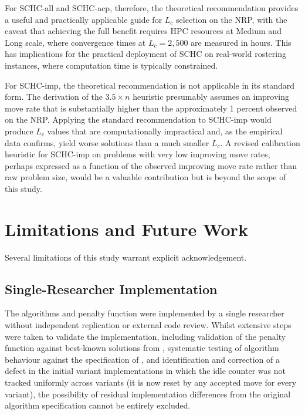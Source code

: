 \documentclass[12pt, a4paper, oneside]{report}
\begin{document}
For SCHC-all and SCHC-acp, therefore, the theoretical recommendation
provides a useful and practically applicable guide for $L_c$
selection on the NRP, with the caveat that achieving the full benefit
requires HPC resources at Medium and Long scale, where convergence
times at $L_c = 2{,}500$ are measured in hours. This has implications
for the practical deployment of SCHC on real-world rostering
instances, where computation time is typically constrained.

For SCHC-imp, the theoretical recommendation is not applicable in
its standard form. The derivation of the $3.5 \times n$ heuristic
presumably assumes an improving move rate that is substantially
higher than the approximately 1 percent observed on the NRP.
Applying the standard recommendation to SCHC-imp would produce $L_c$
values that are computationally impractical and, as the empirical
data confirms, yield worse solutions than a much smaller $L_c$. A
revised calibration heuristic for SCHC-imp on problems with very
low improving move rates, perhaps expressed as a function of the
observed improving move rate rather than raw problem size, would be a
valuable contribution but is beyond the scope of this study.

\newpage
\section{Limitations and Future Work}
\label{sec:limitations}

Several limitations of this study warrant explicit acknowledgement.

\subsection{Single-Researcher Implementation}
\label{sec:disc_solo}

The algorithms and penalty function were implemented by a single
researcher without independent replication or external code review.
Whilst extensive steps were taken to validate the implementation,
including validation of the penalty function against best-known
solutions from \citet{Toffolo2014}, systematic testing of algorithm
behaviour against the specification of \citet{Bykov2016}, and
identification and correction of a defect in the initial variant
implementations in which the idle counter was not tracked uniformly
across variants (it is now reset by any accepted move for every
variant), the
possibility of residual implementation differences from the original
algorithm specification cannot be entirely excluded.
\end{document}
